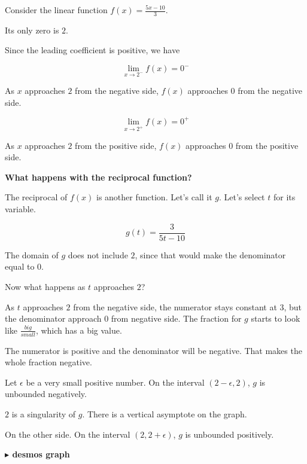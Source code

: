 \documentclass{ximera}
\begin{document}
\begin{exmaple}

Consider the linear function $f(x) = \frac{5x - 10}{3}$. 

Its only zero is $2$. 

Since the leading coefficient is positive, we have


\[
\lim\limits_{x \to 2^-}f(x) = 0^-
\]


As $x$ approaches $2$ from the negative side, $f(x)$ approaches $0$ from the negative side.





\[
\lim\limits_{x \to 2^+}f(x) = 0^+
\]


As $x$ approaches $2$ from the positive side, $f(x)$ approaches $0$ from the positive side.


\textbf{\textcolor{blue!55!black}{What happens with the reciprocal function?}} 

The reciprocal of $f(x)$ is another function.  Let's call it $g$.  Let's select $t$ for its variable.


\[
g(t) = \frac{3}{5t - 10}
\]


The domain of $g$ does not include $2$, since that would make the denominator equal to $0$. 


Now what happens as $t$ approaches $2$? 

As $t$ approaches $2$ from the negative side, the numerator stays constant at $3$, but the denominator approach $0$ from negative side.  The fraction for $g$ starts to look like $\frac{big}{small}$, which has a big value. 

The numerator is positive and the denominator will be negative.  That makes the whole fraction negative.  


Let $\epsilon$ be a very small positive number. On the interval $(2 - \epsilon, 2)$, $g$ is unbounded negatively. 

$2$ is a singularity of $g$.  There is a vertical asymptote on the graph. 




On the other side. On the interval $(2, 2 + \epsilon)$, $g$ is unbounded positively. 










\textbf{\textcolor{blue!55!black}{$\blacktriangleright$ desmos graph}} 
\begin{center}
\end{center}






\end{exmaple}
\end{document}
